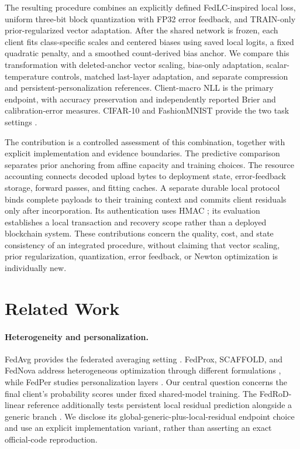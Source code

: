 The resulting procedure combines an explicitly defined FedLC-inspired local loss, uniform three-bit block quantization with FP32 error feedback, and TRAIN-only prior-regularized vector adaptation. After the shared network is frozen, each client fits class-specific scales and centered biases using saved local logits, a fixed quadratic penalty, and a smoothed count-derived bias anchor. We compare this transformation with deleted-anchor vector scaling, bias-only adaptation, scalar-temperature controls, matched last-layer adaptation, and separate compression and persistent-personalization references. Client-macro NLL is the primary endpoint, with accuracy preservation and independently reported Brier and calibration-error measures. CIFAR-10 and FashionMNIST provide the two task settings \cite{krizhevsky2009tiny,xiao2017fashion}.

The contribution is a controlled assessment of this combination, together with explicit implementation and evidence boundaries. The predictive comparison separates prior anchoring from affine capacity and training choices. The resource accounting connects decoded upload bytes to deployment state, error-feedback storage, forward passes, and fitting caches. A separate durable local protocol binds complete payloads to their training context and commits client residuals only after incorporation. Its authentication uses HMAC \cite{rfc2104}; its evaluation establishes a local transaction and recovery scope rather than a deployed blockchain system. These contributions concern the quality, cost, and state consistency of an integrated procedure, without claiming that vector scaling, prior regularization, quantization, error feedback, or Newton optimization is individually new.

\section{Related Work}

\paragraph{Heterogeneity and personalization.}
FedAvg provides the federated averaging setting \cite{mcmahan2017fedavg}. FedProx, SCAFFOLD, and FedNova address heterogeneous optimization through different formulations \cite{li2020fedprox,karimireddy2020scaffold,wang2020fednova}, while FedPer studies personalization layers \cite{arivazhagan2019fedper}. Our central question concerns the final client's probability scores under fixed shared-model training. The FedRoD-linear reference additionally tests persistent local residual prediction alongside a generic branch \cite{chen2022fedrod}. We disclose its global-generic-plus-local-residual endpoint choice and use an explicit implementation variant, rather than asserting an exact official-code reproduction.

